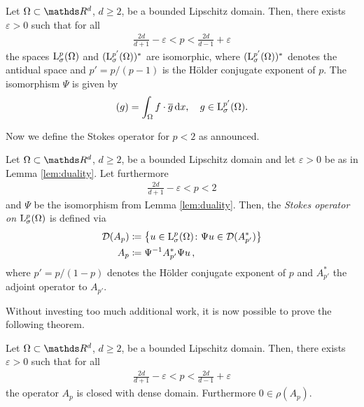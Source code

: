 \begin{lem}
  \label{lem:duality}
  Let $\Omega \subset \R^d$, $d \geq 2$, be a bounded Lipschitz domain.
  Then, there exists $\varepsilon > 0$ such that for all 
  \begin{align*}
    \frac{2d}{d + 1} - \varepsilon < p < \frac{2d}{d - 1} + \varepsilon
  \end{align*}
  the spaces $\mathrm{L}^p_\sigma(\Omega)$ and $(\mathrm{L}^{p'}_\sigma(\Omega))^*$ are isomorphic, where $(\mathrm{L}^{p'}_\sigma(\Omega))^*$ denotes the antidual space and $p' = p/ (p - 1)$  is the Hölder conjugate exponent of $p$. 
  The isomorphism $\Psi$ is given by
  \begin{align*}
    [\Psi f](g) = \int_\Omega f \cdot \overline g  \d x, \quad g \in \Ell^{p'}_\sigma(\Omega).
  \end{align*}
\end{lem}

Now we define the Stokes operator for $p < 2$ as announced.

\begin{defn}
  Let $\Omega \subset \R^d$, $d \geq 2$, be a bounded Lipschitz domain and let $\varepsilon > 0$ be as in Lemma \ref{lem:duality}.
  Let furthermore
  \begin{align*}
    \frac{2d}{d + 1} - \varepsilon < p < 2
  \end{align*}
  and $\Psi$ be the isomorphism from Lemma \ref{lem:duality}.
  Then, the \emph{Stokes operator on} $\mathrm{L}^p_\sigma(\Omega)$ is defined via
  \begin{align*}
    \mathcal{D}(A_p) & \coloneqq \big\{ u \in \mathrm{L}^p_\sigma(\Omega) \colon \Psi u \in \mathcal{D}(A^*_{p'}) \big\} \\
    A_p &\coloneqq \Psi^{-1} A^*_{p'} \Psi u\,,
  \end{align*}
  where $p' = p/(1 - p)$ denotes the Hölder conjugate exponent of $p$ and $A^*_{p'}$ the adjoint operator to $A_{p'}$.
\end{defn}

Without investing too much additional work, it is now possible to prove the following theorem.

\begin{thm}
  \label{thm:stokesOperatorLp}
  Let $\Omega \subset \R^d$, $d \geq 2$, be a bounded Lipschitz domain. 
  Then, there exists $\varepsilon > 0$ such that for all 
  \begin{align*}
    \frac{2d}{d + 1} - \varepsilon < p < \frac{2d}{d - 1} + \varepsilon
  \end{align*}
  the operator $A_p$ is closed with dense domain. Furthermore $0 \in \rho(A_p)$.
\end{thm}

